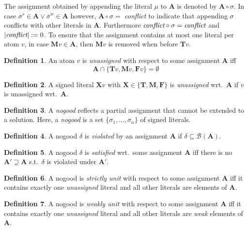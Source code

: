 \documentclass{vutinfth} %
\theoremstyle{example}
\theoremstyle{definition}
\newtheorem{definition}{Definition}[section]
\theoremstyle{theorem}
\theoremstyle{lemma}
\theoremstyle{corollary}
\newcommand{\negstrong}[1]{\overline{#1}^s}
\newcommand{\negweak}[1]{\overline{#1}^w}
\newcommand{\bass}{\mathcal{B}}
\newcommand{\ass}{\mathbf{A}}
\newcommand{\bT}{\mathbf{T}}
\newcommand{\bM}{\mathbf{M}}
\newcommand{\bF}{\mathbf{F}}
\newcommand{\bX}{\mathbf{X}}
\newcommand{\sgl}{\mu}
\newcommand{\bsgl}{\sigma}
\newcommand{\thrice}{{\{\bT, \bM, \bF \}}}
\begin{document}
The assignment obtained by appending the literal $\sgl$ to $\ass$ is denoted by $\ass \circ \sigma$. In case $\negstrong{\sigma} \in \ass \vee \negweak{\sigma} \in \ass$ however, $\ass \circ \sigma =$ \emph{conflict} to indicate that appending $\sigma$ conflicts with other literals in $\ass$. Furthermore $\emph{conflict} \circ \sigma = \emph{conflict}$ and $|\emph{conflict}| := 0$. To ensure that the assignment contains at most one literal per atom $v$, in case $\bM v \in \ass$, then $\bM v$ is removed when before $\bT v$.

\begin{definition}
An atom $v$ is \emph{unassigned} with respect to some assignment $\ass$ iff $$\ass \cap \{\bT v, \bM v, \bF v \} = \emptyset$$
\end{definition}

\begin{definition}
A signed literal $\bX v$ with $\bX \in \thrice$ is \emph{unassigned} wrt.~$\ass$ if $v$ is unassigned wrt.~$\ass$.
\end{definition}

\begin{definition}
A \emph{nogood} reflects a partial assignment that cannot be extended to a solution. Here, a \emph{nogood} is a set $\{ \bsgl_1, \ldots, \bsgl_n \}$ of signed literals.
\end{definition}

\begin{definition}
A nogood $\delta$ is \emph{violated} by an assignment $\ass$ if $\delta \subseteq \bass(\ass)$.
\end{definition}

\begin{definition}
A nogood $\delta$ is \emph{satisfied} wrt.~some assignment $\ass$ iff there is no $\ass' \supseteq \ass$ s.t.~$\delta$ is violated under $\ass'$.
\end{definition}

\begin{definition}
A nogood is \emph{strictly unit} with respect to some assignment $\ass$ iff it contains exactly one \emph{unassigned} literal and all other literals are elements of $\ass$.
\end{definition}

\begin{definition}
A nogood is \emph{weakly unit} with respect to some assignment $\ass$ iff it contains exactly one \emph{unassigned} literal and all other literals are \emph{weak} elements of $\ass$.
\end{definition}
\end{document}
